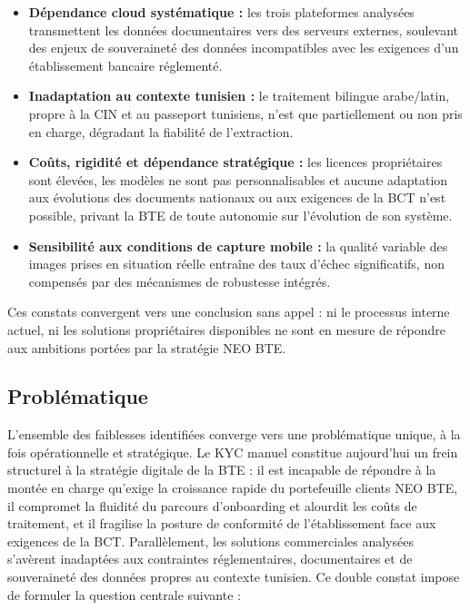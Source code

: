 \begin{itemize}
  \item \textbf{Dépendance cloud systématique :} les trois plateformes analysées transmettent les données documentaires vers des serveurs externes, soulevant des enjeux de souveraineté des données incompatibles avec les exigences d'un établissement bancaire réglementé.
  \item \textbf{Inadaptation au contexte tunisien :} le traitement bilingue arabe/latin, propre à la CIN et au passeport tunisiens, n'est que partiellement ou non pris en charge, dégradant la fiabilité de l'extraction.
  \item \textbf{Coûts, rigidité et dépendance stratégique :} les licences propriétaires sont élevées, les modèles ne sont pas personnalisables et aucune adaptation aux évolutions des documents nationaux ou aux exigences de la BCT n'est possible, privant la BTE de toute autonomie sur l'évolution de son système.
  \item \textbf{Sensibilité aux conditions de capture mobile :} la qualité variable des images prises en situation réelle entraîne des taux d'échec significatifs, non compensés par des mécanismes de robustesse intégrés.
\end{itemize}

Ces constats convergent vers une conclusion sans appel : ni le processus interne actuel, ni les solutions propriétaires disponibles ne sont en mesure de répondre aux ambitions portées par la stratégie NEO BTE.

\subsection{Problématique }
\label{subsec:problematique}

L'ensemble des faiblesses identifiées converge vers une problématique unique, à la fois opérationnelle et stratégique. Le KYC manuel constitue aujourd'hui un frein structurel à la stratégie digitale de la BTE : il est incapable de répondre à la montée en charge qu'exige la croissance rapide du portefeuille clients NEO BTE, il compromet la fluidité du parcours d'onboarding et alourdit les coûts de traitement, et il fragilise la posture de conformité de l'établissement face aux exigences de la BCT. Parallèlement, les solutions commerciales analysées s'avèrent inadaptées aux contraintes réglementaires, documentaires et de souveraineté des données propres au contexte tunisien. Ce double constat impose de formuler la question centrale suivante :

